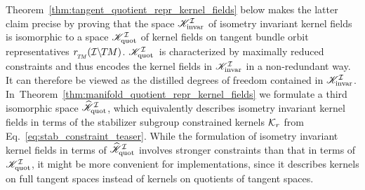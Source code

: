 Theorem~\ref{thm:tangent_quotient_repr_kernel_fields} below makes the latter claim precise by proving that the space $\mathscr{K}_\textup{invar}^{\mathcal{I}}$ of isometry invariant kernel fields is isomorphic to a space $\mathscr{K}_\textup{quot}^{\mathcal{I}}$ of kernel fields on tangent bundle orbit representatives $\rTM(\ITM)$.
$\mathscr{K}_\textup{quot}^{\mathcal{I}}$~is characterized by maximally reduced constraints and thus encodes the kernel fields in $\mathscr{K}_\textup{invar}^{\mathcal{I}}$ in a non-redundant way.
It can therefore be viewed as the distilled degrees of freedom contained in $\mathscr{K}_\textup{invar}^{\mathcal{I}}$.
In~Theorem~\ref{thm:manifold_quotient_repr_kernel_fields} we formulate a third isomorphic space $\KIquothat$, which equivalently describes isometry invariant kernel fields in terms of the stabilizer subgroup constrained kernels $\mathcal{K}_r$ from Eq.~\eqref{eq:stab_constraint_teaser}.
While the formulation of isometry invariant kernel fields in terms of $\KIquothat$ involves stronger constraints than that in terms of $\mathscr{K}_\textup{quot}^{\mathcal{I}}$, it might be more convenient for implementations, since it describes kernels on full tangent spaces instead of kernels on quotients of tangent spaces.

